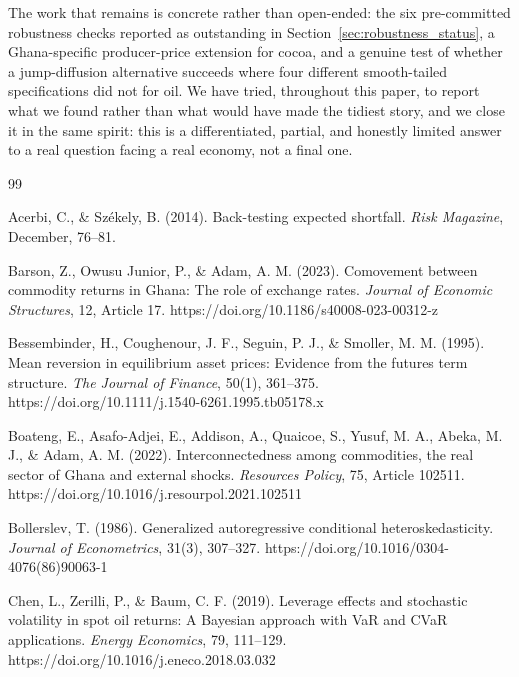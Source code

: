 \documentclass[preprint,12pt,authoryear]{elsarticle}
\begin{document}
The work that remains is concrete rather than open-ended: the six pre-committed robustness checks reported as outstanding in Section~\ref{sec:robustness_status}, a Ghana-specific producer-price extension for cocoa, and a genuine test of whether a jump-diffusion alternative succeeds where four different smooth-tailed specifications did not for oil. We have tried, throughout this paper, to report what we found rather than what would have made the tidiest story, and we close it in the same spirit: this is a differentiated, partial, and honestly limited answer to a real question facing a real economy, not a final one.


\begin{thebibliography}{99}

Acerbi, C., \& Sz\'ekely, B. (2014). Back-testing expected shortfall. \textit{Risk Magazine}, December, 76--81.

Barson, Z., Owusu Junior, P., \& Adam, A. M. (2023). Comovement between commodity returns in Ghana: The role of exchange rates. \textit{Journal of Economic Structures}, 12, Article 17. https://doi.org/10.1186/s40008-023-00312-z

Bessembinder, H., Coughenour, J. F., Seguin, P. J., \& Smoller, M. M. (1995). Mean reversion in equilibrium asset prices: Evidence from the futures term structure. \textit{The Journal of Finance}, 50(1), 361--375. https://doi.org/10.1111/j.1540-6261.1995.tb05178.x

Boateng, E., Asafo-Adjei, E., Addison, A., Quaicoe, S., Yusuf, M. A., Abeka, M. J., \& Adam, A. M. (2022). Interconnectedness among commodities, the real sector of Ghana and external shocks. \textit{Resources Policy}, 75, Article 102511. https://doi.org/10.1016/j.resourpol.2021.102511

Bollerslev, T. (1986). Generalized autoregressive conditional heteroskedasticity. \textit{Journal of Econometrics}, 31(3), 307--327. https://doi.org/10.1016/0304-4076(86)90063-1

Chen, L., Zerilli, P., \& Baum, C. F. (2019). Leverage effects and stochastic volatility in spot oil returns: A Bayesian approach with VaR and CVaR applications. \textit{Energy Economics}, 79, 111--129. https://doi.org/10.1016/j.eneco.2018.03.032


\end{thebibliography}
\end{document}
